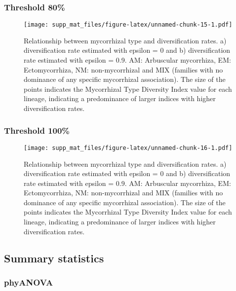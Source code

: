 \documentclass[]{article}
\begin{document}
\hypertarget{threshold-80-1}{%
\subsubsection{Threshold 80\%}\label{threshold-80-1}}

\begin{figure}
\centering
\texttt{[image: supp\_mat\_files/figure-latex/unnamed-chunk-15-1.pdf]}
\caption{Relationship between mycorrhizal type and diversification
rates. a) diversification rate estimated with epsilon = 0 and b)
diversification rate estimated with epsilon = 0.9. AM: Arbuscular
mycorrhiza, EM: Ectomycorrhiza, NM: non-mycorrhizal and MIX (families
with no dominance of any specific mycorrhizal association). The size of
the points indicates the Mycorrhizal Type Diversity Index value for each
lineage, indicating a predominance of larger indices with higher
diversification rates.}
\end{figure}

\hypertarget{threshold-100-1}{%
\subsubsection{Threshold 100\%}\label{threshold-100-1}}

\begin{figure}
\centering
\texttt{[image: supp\_mat\_files/figure-latex/unnamed-chunk-16-1.pdf]}
\caption{Relationship between mycorrhizal type and diversification
rates. a) diversification rate estimated with epsilon = 0 and b)
diversification rate estimated with epsilon = 0.9. AM: Arbuscular
mycorrhiza, EM: Ectomycorrhiza, NM: non-mycorrhizal and MIX (families
with no dominance of any specific mycorrhizal association). The size of
the points indicates the Mycorrhizal Type Diversity Index value for each
lineage, indicating a predominance of larger indices with higher
diversification rates.}
\end{figure}

\pagebreak

\hypertarget{summary-statistics-1}{%
\subsection{Summary statistics}\label{summary-statistics-1}}

\hypertarget{phyanova-2}{%
\subsubsection{phyANOVA}\label{phyanova-2}}
\end{document}
